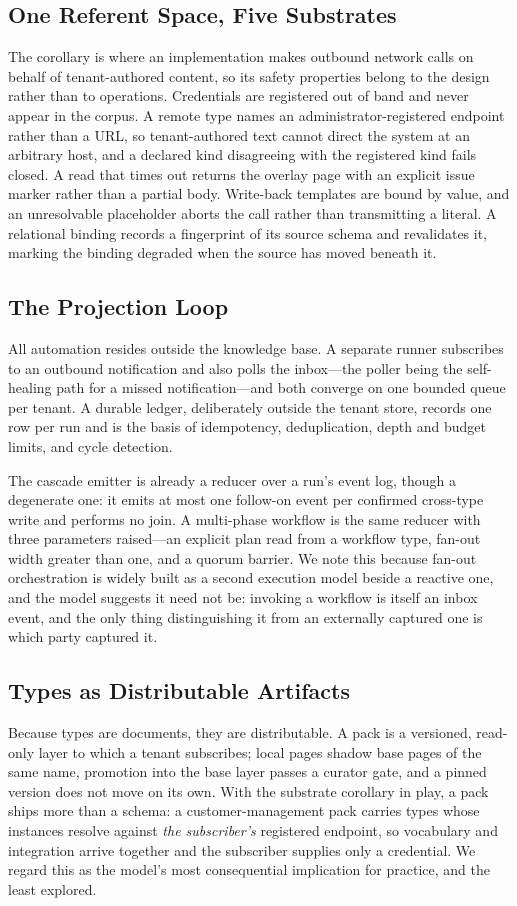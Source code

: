\documentclass[journal,nofonttune]{IEEEtran}
\begin{document}
\subsection{One Referent Space, Five Substrates}
\label{sec:substrates}
The corollary is where an implementation makes outbound network calls on
behalf of tenant-authored content, so its safety properties belong to the
design rather than to operations. Credentials are registered out of band and
never appear in the corpus. A remote type names an administrator-registered
endpoint rather than a URL, so tenant-authored text cannot direct the system
at an arbitrary host, and a declared kind disagreeing with the registered
kind fails closed. A read that times out returns the overlay page with an
explicit issue marker rather than a partial body. Write-back templates are
bound by value, and an unresolvable placeholder aborts the call rather than
transmitting a literal. A relational binding records a fingerprint of its
source schema and revalidates it, marking the binding degraded when the
source has moved beneath it.

\subsection{The Projection Loop}
All automation resides outside the knowledge base. A separate runner
subscribes to an outbound notification and also polls the inbox---the poller
being the self-healing path for a missed notification---and both converge on
one bounded queue per tenant. A durable ledger, deliberately outside the
tenant store, records one row per run and is the basis of idempotency,
deduplication, depth and budget limits, and cycle detection.

The cascade emitter is already a reducer over a run's event log, though a
degenerate one: it emits at most one follow-on event per confirmed cross-type
write and performs no join. A multi-phase workflow is the same reducer with
three parameters raised---an explicit plan read from a workflow type, fan-out
width greater than one, and a quorum barrier. We note this because fan-out
orchestration is widely built as a second execution model beside a reactive
one, and the model suggests it need not be: invoking a workflow is itself an
inbox event, and the only thing distinguishing it from an externally captured
one is which party captured it.

\subsection{Types as Distributable Artifacts}
\label{sec:packs}
Because types are documents, they are distributable. A pack is a versioned,
read-only layer to which a tenant subscribes; local pages shadow base pages
of the same name, promotion into the base layer passes a curator gate, and a
pinned version does not move on its own. With the substrate corollary in
play, a pack ships more than a schema: a customer-management pack carries
types whose instances resolve against \emph{the subscriber's} registered
endpoint, so vocabulary and integration arrive together and the subscriber
supplies only a credential. We regard this as the model's most consequential
implication for practice, and the least explored.
\end{document}
